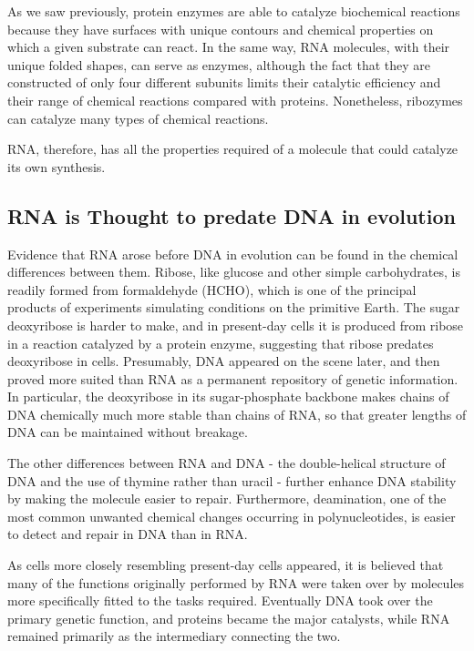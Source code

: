 As we saw previously, protein enzymes are able to catalyze biochemical
reactions because they have surfaces with unique contours and chemical
properties on which a given substrate can react. In the same way,
RNA molecules, with their unique folded shapes, can serve as enzymes,
although the fact that they are constructed of only four different
subunits limits their catalytic efficiency and their range of chemical
reactions compared with proteins. Nonetheless, ribozymes can catalyze
many types of chemical reactions.

RNA, therefore, has all the properties required of a molecule that could
catalyze its own synthesis.

\subsection{RNA is Thought to predate DNA in evolution}

Evidence that RNA arose before DNA in evolution can be found in the
chemical differences between them. Ribose, like glucose and other
simple carbohydrates, is readily formed from formaldehyde
(HCHO), which is one of the principal products of experiments simulating
conditions on the primitive Earth. The sugar deoxyribose is harder to
make, and in present-day cells it is produced from ribose in a reaction
catalyzed by a protein enzyme, suggesting that ribose predates deoxyribose
in cells. Presumably, DNA appeared on the scene later, and then
proved more suited than RNA as a permanent repository of genetic information.
In particular, the deoxyribose in its sugar-phosphate backbone
makes chains of DNA chemically much more stable than chains of RNA,
so that greater lengths of DNA can be maintained without breakage.

The other differences between RNA and DNA - the double-helical structure
of DNA and the use of thymine rather than uracil - further enhance
DNA stability by making the molecule easier to repair.
Furthermore, deamination, one of the most common unwanted chemical changes occurring in
polynucleotides, is easier to detect and repair in DNA than in RNA.

As cells more closely resembling present-day cells appeared, it is
believed that many of the functions originally performed by RNA were
taken over by molecules more specifically fitted to the tasks required.
Eventually DNA took over the primary genetic function, and proteins
became the major catalysts, while RNA remained primarily as the intermediary
connecting the two.

